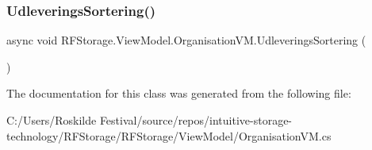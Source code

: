 \mbox{\label{class_r_f_storage_1_1_view_model_1_1_organisation_v_m_a666838928a19d3aad732e206966d0418}} 
\subsubsection{UdleveringsSortering()}
{\footnotesize\ttfamily async void R\+F\+Storage.\+View\+Model.\+Organisation\+V\+M.\+Udleverings\+Sortering (\begin{DoxyParamCaption}{ }\end{DoxyParamCaption})}







The documentation for this class was generated from the following file\+:\begin{DoxyCompactItemize}
\item 
C\+:/\+Users/\+Roskilde Festival/source/repos/intuitive-\/storage-\/technology/\+R\+F\+Storage/\+R\+F\+Storage/\+View\+Model/Organisation\+V\+M.\+cs\end{DoxyCompactItemize}
